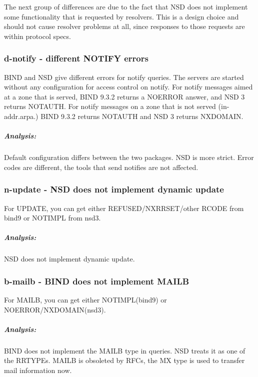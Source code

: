 \documentclass[twoside,titlepage,english]{nlnetlabs}
\begin{document}
The next group of differences are due to the fact that NSD does not
implement some functionality that is requested by resolvers.  This 
is a design choice and should not cause resolver problems at all,
since responses to those requests are within protocol specs.


\subsubsection{d-notify - different NOTIFY errors}
\label{d-notify}

BIND and NSD give different errors for notify queries. The servers are started 
without any configuration for access control on notify. For notify messages 
aimed at a zone that is served, BIND 9.3.2 returns a NOERROR answer, and 
NSD 3 returns NOTAUTH. For notify messages on a zone that is not served 
(in-addr.arpa.) BIND 9.3.2 returns NOTAUTH and NSD 3 returns NXDOMAIN.

\vspace{-8pt}\subparagraph{Analysis:}

Default configuration differs between the two packages. NSD is more strict.
Error codes are different, the tools that send notifies are not affected.


\subsubsection{n-update - NSD does not implement dynamic update}
\label{n-update}

For UPDATE, you can get either REFUSED/NXRRSET/other RCODE from bind9 or 
NOTIMPL from nsd3.

\vspace{-8pt}\subparagraph{Analysis:}

NSD does not implement dynamic update. 


\subsubsection{b-mailb - BIND does not implement MAILB}
\label{b-mailb}

For MAILB, you can get either NOTIMPL(bind9) or NOERROR/NXDOMAIN(nsd3).

\vspace{-8pt}\subparagraph{Analysis:}

BIND does not implement the MAILB type in queries. NSD treats it as 
one of the RRTYPEs. MAILB is obsoleted by RFCs, the MX type is 
used to transfer mail information now.
\end{document}
